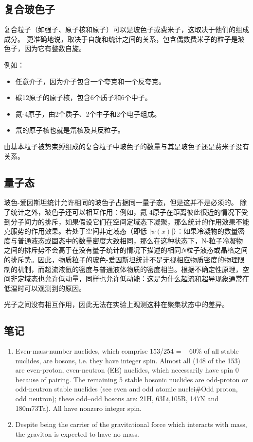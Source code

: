\subsection{复合玻色子}
复合粒子（如强子、原子核和原子）可以是玻色子或费米子，这取决于他们的组成成分。 更准确地说，取决于自旋和统计之间的关系，包含偶数费米子的粒子是玻色子，因为它有整数自旋。

例如：
\begin{itemize}
\item 任意介子，因为介子包含一个夸克和一个反夸克。
\item 碳12原子的原子核，包含6个质子和6个中子。
\item 氦-4原子，由2个质子、2个中子和2个电子组成。
\item 氘的原子核也就是氘核及其反粒子。
\end{itemize}
由基本粒子被势束缚组成的复合粒子中玻色子的数量与其是玻色子还是费米子没有关系。

\subsection{ 量子态}
玻色-爱因斯坦统计允许相同的玻色子占据同一量子态，但是这并不是必须的。 除了统计之外，玻色子还可以相互作用：例如，氦-4原子在距离彼此很近的情况下受到分子间力的排斥，如果假设它们在空间定域态下凝聚，那么统计的作用效果不能克服势的作用效果。若处于空间非定域态（即低 $|\psi(x)|$）：如果冷凝物的数量密度与普通液态或固态中的数量密度大致相同，那么在这种状态下，N-粒子冷凝物之间的排斥势不会高于在没有量子统计的情况下描述的相同$N$粒子液态或晶格之间的排斥势。因此，物质粒子的玻色-爱因斯坦统计不是无视相应物质密度的物理限制的机制，而超流液氦的密度与普通液体物质的密度相当。根据不确定性原理，空间非定域态也允许低动量，同样也允许低动能：这是为什么超流和超导现象通常在低温时可以观测到的原因。

光子之间没有相互作用，因此无法在实验上观测这种在聚集状态中的差异。

\subsection{笔记}
\begin{enumerate}
\item Even-mass-number nuclides, which comprise 153/254 = ~ 60\% of all stable nuclides, are bosons, i.e. they have integer spin. Almost all (148 of the 153) are even-proton, even-neutron (EE) nuclides, which necessarily have spin 0 because of pairing. The remaining 5 stable bosonic nuclides are odd-proton or odd-neutron stable nuclides (see even and odd atomic nuclei#Odd proton, odd neutron); these odd–odd bosons are: 21H, 63Li,105B, 147N and 180m73Ta). All have nonzero integer spin.
\item Despite being the carrier of the gravitational force which interacts with mass, the graviton is expected to have no mass.
\end{enumerate}

